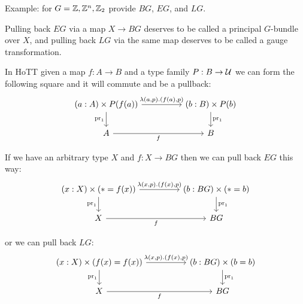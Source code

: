 \documentclass[14pt]{extarticle}
\begin{document}
Example: for $G=\mathbb{Z}, \mathbb{Z}^n, \mathbb{Z}_2 $ provide $BG$, $EG$, and $LG$.

Pulling back $EG$ via a map $X\to BG$ deserves to be called a principal $G$-bundle over $X$, and pulling back $LG$ via the same map deserves to be called a gauge transformation.

In HoTT given a map $f:A\to B$ and a type family $P:B\to \mathcal{U}$ we can form the following square and it will commute and be a pullback:
\[\begin{tikzcd}
	{(a:A)\times P(f(a))} && {(b:B)\times P(b)} \\
	A && B
	\arrow["{\mathrm{pr}_1}", from=1-3, to=2-3]
	\arrow["{\lambda(a, p).(f(a),p)}", from=1-1, to=1-3]
	\arrow["f"', from=2-1, to=2-3]
	\arrow["{\mathrm{pr}_1}"', from=1-1, to=2-1]
\end{tikzcd}\]

If we have an arbitrary type $X$ and $f:X\to BG$ then we can pull back $EG$ this way:
\[\begin{tikzcd}
	{(x:X)\times (*=f(x))} && {(b:BG)\times (*=b)} \\
	X && BG
	\arrow["{\mathrm{pr}_1}", from=1-3, to=2-3]
	\arrow["{\lambda(x, p).(f(x),p)}", from=1-1, to=1-3]
	\arrow["f"', from=2-1, to=2-3]
	\arrow["{\mathrm{pr}_1}"', from=1-1, to=2-1]
\end{tikzcd}\]

or we can pull back $LG$:
\[\begin{tikzcd}
	{(x:X)\times (f(x)=f(x))} && {(b:BG)\times (b=b)} \\
	X && BG
	\arrow["{\mathrm{pr}_1}", from=1-3, to=2-3]
	\arrow["{\lambda(x, p).(f(x),p)}", from=1-1, to=1-3]
	\arrow["f"', from=2-1, to=2-3]
	\arrow["{\mathrm{pr}_1}"', from=1-1, to=2-1]
\end{tikzcd}\]
\end{document}
